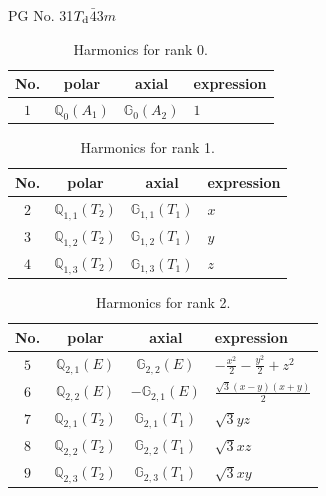 \documentclass[fleqn,8pt,landscape]{jsarticle}
\begin{document}
\setcounter{MaxMatrixCols}{32}

\renewcommand{\tablename}{Table~}
\renewcommand{\figurename}{Figure~}
\begin{center}
\LARGE
PG No. 31\quad$T_{\rm d}$\quad$\bar{4}3m$\quad[ cubic ]
\end{center}
\begin{table}[ht!]
\begin{center}
\caption{Harmonics for rank 0.}
\renewcommand{\arraystretch}{1.3}
\begin{tabular}{cccl} \hline \hline
No. & polar & axial & expression \\ \hline
$ 1 $ & $ \mathbb{Q}_{0}(A_{1}) $ & $ \mathbb{G}_{0}(A_{2}) $ & $ 1 $ \\
 \hline \hline
\end{tabular}
\end{center}
\end{table}
\begin{table}[ht!]
\begin{center}
\caption{Harmonics for rank 1.}
\renewcommand{\arraystretch}{1.3}
\begin{tabular}{cccl} \hline \hline
No. & polar & axial & expression \\ \hline
$ 2 $ & $ \mathbb{Q}_{1,1}(T_{2}) $ & $ \mathbb{G}_{1,1}(T_{1}) $ & $ x $ \\
$ 3 $ & $ \mathbb{Q}_{1,2}(T_{2}) $ & $ \mathbb{G}_{1,2}(T_{1}) $ & $ y $ \\
$ 4 $ & $ \mathbb{Q}_{1,3}(T_{2}) $ & $ \mathbb{G}_{1,3}(T_{1}) $ & $ z $ \\
 \hline \hline
\end{tabular}
\end{center}
\end{table}
\begin{table}[ht!]
\begin{center}
\caption{Harmonics for rank 2.}
\renewcommand{\arraystretch}{1.3}
\begin{tabular}{cccl} \hline \hline
No. & polar & axial & expression \\ \hline
$ 5 $ & $ \mathbb{Q}_{2,1}(E) $ & $ \mathbb{G}_{2,2}(E) $ & $ - \frac{x^{2}}{2} - \frac{y^{2}}{2} + z^{2} $ \\
$ 6 $ & $ \mathbb{Q}_{2,2}(E) $ & $ -\mathbb{G}_{2,1}(E) $ & $ \frac{\sqrt{3} \left(x - y\right) \left(x + y\right)}{2} $ \\
$ 7 $ & $ \mathbb{Q}_{2,1}(T_{2}) $ & $ \mathbb{G}_{2,1}(T_{1}) $ & $ \sqrt{3} y z $ \\
$ 8 $ & $ \mathbb{Q}_{2,2}(T_{2}) $ & $ \mathbb{G}_{2,2}(T_{1}) $ & $ \sqrt{3} x z $ \\
$ 9 $ & $ \mathbb{Q}_{2,3}(T_{2}) $ & $ \mathbb{G}_{2,3}(T_{1}) $ & $ \sqrt{3} x y $ \\
 \hline \hline
\end{tabular}
\end{center}
\end{table}
\end{document}
